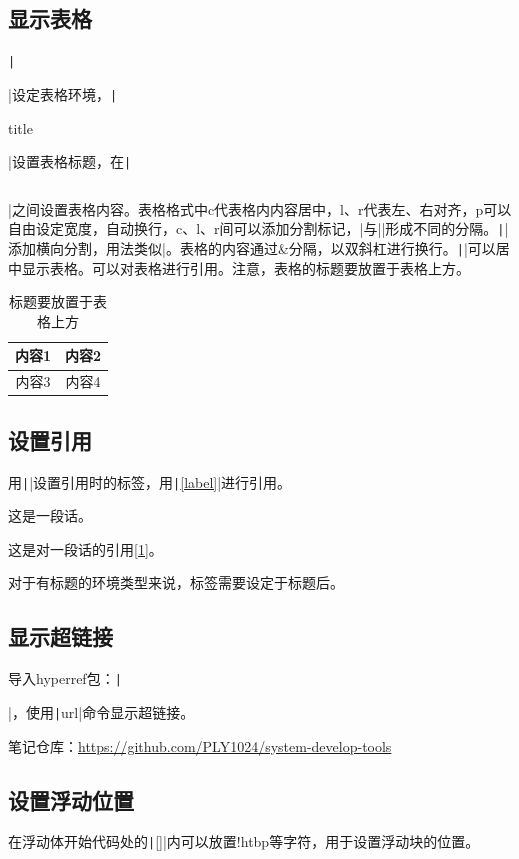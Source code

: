 \documentclass[fontset=ubuntu]{ctexart}
\begin{document}
\subsection{显示表格}
\texttt|\begin{table}[h] \end{table}|设定表格环境，\texttt|\caption{title}|设置表格标题，在\texttt|\begin{tabular}{c c c} \end{tabular}|之间设置表格内容。表格格式中c代表格内内容居中，l、r代表左、右对齐，p可以自由设定宽度，自动换行，c、l、r间可以添加分割标记，|与||形成不同的分隔。\texttt|\hline|添加横向分割，用法类似|。表格的内容通过\&分隔，以双斜杠进行换行。\texttt|\centering|可以居中显示表格。可以对表格进行引用。注意，表格的标题要放置于表格上方。
\begin{table}[htb]
    \centering
    \caption{标题要放置于表格上方}
    \begin{tabular}{c||c}
        \hline\hline
        内容1 & 内容2 \\
        \hline
        内容3 & 内容4 
    \end{tabular}
    \label{tab:my_label}
\end{table}


\subsection{设置引用}
用\texttt|\label{label}|设置引用时的标签，用\texttt|\ref{label}|进行引用。

这是一段话\label{1}。

这是对一段话的引用\ref{1}。

对于有标题的环境类型来说，标签需要设定于标题后。

\subsection{显示超链接}
导入hyperref包：\texttt|\usepackage{hyperref}|，使用\texttt|url{}|命令显示超链接。

笔记仓库：\url{https://github.com/PLY1024/system-develop-tools}

\subsection{设置浮动位置}
在浮动体开始代码处的\texttt|[]|内可以放置!htbp等字符，用于设置浮动块的位置。
\end{document}
